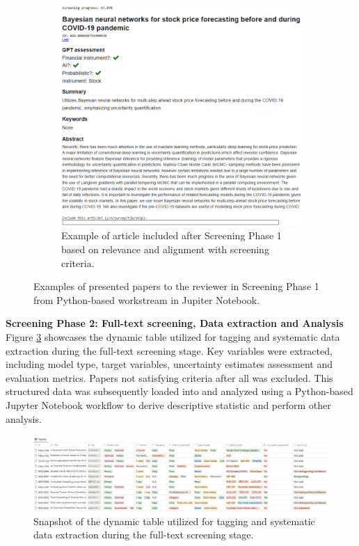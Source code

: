 \begin{figure}[H]
\begin{subfigure}[b]{0.49\textwidth}
         \includegraphics[width=\textwidth]{Images/screening_b2.png}
         \caption{Example of article included after Screening Phase 1 based on relevance and alignment with screening criteria.}
         \label{fig:screening_phase_1_included}
     \end{subfigure}
     \caption[Visualization of streamlined paper screening process methodology during Screening Phase 1]{Examples of presented papers to the reviewer in Screening Phase 1 from Python-based workstream in Jupiter Notebook.}
    \label{fig:screening_process_phase_1}
\end{figure}

\textbf{Screening Phase 2: Full-text screening, Data extraction and Analysis} \\
Figure \ref{fig:screening_process_phase_2} showcases the dynamic table utilized for tagging and systematic data extraction during the full-text screening stage. Key variables were extracted, including model type, target variables, uncertainty estimates assessment and evaluation metrics. Papers not satisfying criteria after all was excluded. This structured data was subsequently loaded into and analyzed using a Python-based  Jupyter Notebook workflow to derive descriptive statistic and perform other analysis. 
\begin{figure}[H]
    \centering
    \includegraphics[width=1\linewidth]{Images/screening_process_phase_2.png}
    \caption[Dynamic table for systematic data extraction during full-text screening in Screening Phase 2]{Snapshot of the dynamic table utilized for tagging and systematic data extraction during the full-text screening stage.}
    \label{fig:screening_process_phase_2}
\end{figure}



